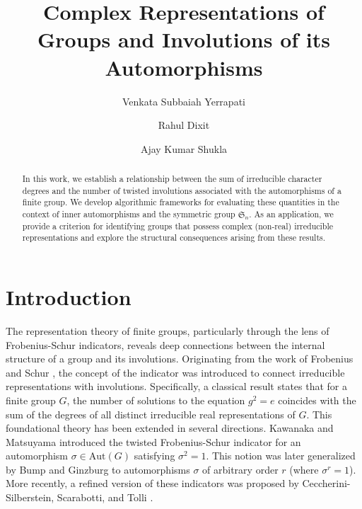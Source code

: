 \documentclass[oneside]{amsart}
\title[Complex Representations of Groups and Involutions of its Automorphisms]{Complex Representations of Groups and Involutions of its Automorphisms}
\author[Yerrapati]{Venkata Subbaiah Yerrapati}
\author[Dixit]{Rahul Dixit}
\author[Shukla]{Ajay Kumar Shukla}
\theoremstyle{plain}
\theoremstyle{definition}
\theoremstyle{remark}
\begin{document}
 \begin{abstract}
       In this work, we establish a relationship between the sum of irreducible character degrees and the number of twisted involutions associated with the automorphisms of a finite group. We develop algorithmic frameworks for evaluating these quantities in the context of inner automorphisms and the symmetric group $\mathfrak{S}_n$. As an application, we provide a criterion for identifying groups that possess complex (non-real) irreducible representations and explore the structural consequences arising from these results.
    \end{abstract}


    
    \maketitle
\section{Introduction}
    The representation theory of finite groups, particularly through the lens of Frobenius-Schur indicators, reveals deep connections between the internal structure of a group and its involutions. Originating from the work of Frobenius and Schur \cite{zbMATH02646565}, the concept of the indicator was introduced to connect irreducible representations with involutions. Specifically, a classical result states that for a finite group $G$, the number of solutions to the equation $g^2 = e$ coincides with the sum of the degrees of all distinct irreducible real representations of $G$. This foundational theory has been extended in several directions. Kawanaka and Matsuyama \cite{MR1078503} introduced the twisted Frobenius-Schur indicator for an automorphism $\sigma \in \mathrm{Aut}(G)$ satisfying $\sigma^2 = 1$. This notion was later generalized by Bump and Ginzburg \cite{MR2068079} to automorphisms $\sigma$ of arbitrary order $r$ (where $\sigma^r = 1$). More recently, a refined version of these indicators was proposed by Ceccherini-Silberstein, Scarabotti, and Tolli \cite{MR3320995}.
    
\end{document}
